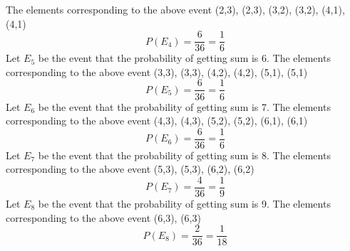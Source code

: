 \documentclass[journal,12pt,twocolumn]{IEEEtran}
\begin{document}
{The elements corresponding to the above event {(2,3), (2,3), (3,2), (3,2), (4,1), (4,1) }}
\[P(E_{4})=\frac{6}{36} = \frac{1}{6} \] 
\newline
{Let \textbf{$E_{5}$} be the event that the probability of getting sum is 6.}
{The elements corresponding to the above event {(3,3), (3,3), (4,2), (4,2), (5,1), (5,1) }}
\[P(E_{5})=\frac{6}{36} = \frac{1}{6} \] 
\newline
{Let \textbf{$E_{6}$} be the event that the probability of getting sum is 7.}
{The elements corresponding to the above event {(4,3), (4,3), (5,2), (5,2), (6,1), (6,1) }}
\[P(E_{6})=\frac{6}{36} = \frac{1}{6} \] 
\newline
{Let \textbf{$E_{7}$} be the event that the probability of getting sum is 8.}
{The elements corresponding to the above event {(5,3), (5,3), (6,2), (6,2)}}
\[P(E_{7})=\frac{4}{36} = \frac{1}{9} \] 
\newline
{Let \textbf{$E_8$} be the event that the probability of getting sum is 9.}
{The elements corresponding to the above event {(6,3), (6,3)}}
\[P(E_{8})=\frac{2}{36} = \frac{1}{18} \] 
\end{document}
